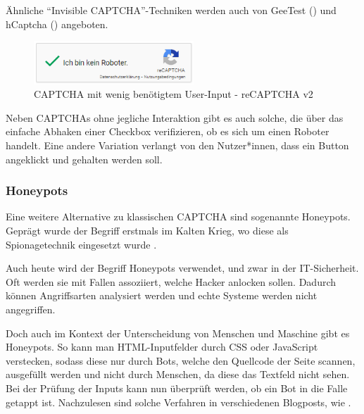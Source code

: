 Ähnliche ``Invisible CAPTCHA''-Techniken werden auch von GeeTest \linebreak(\cite{geetest}) und hCaptcha (\cite{hcaptcha}) angeboten.

\begin{figure}[h!]
    \centering\includegraphics[width=6cm]{gfx/mygraphics/recaptcha.png}
     \caption{CAPTCHA mit wenig benötigtem User-Input - reCAPTCHA v2}
      \label{fig:recaptcha}
\end{figure}

\pagebreak

Neben CAPTCHAs ohne jegliche Interaktion gibt es auch solche, 
die über das einfache Abhaken einer Checkbox verifizieren, ob es sich um einen Roboter handelt.
Eine andere Variation verlangt von den Nutzer*innen, dass ein Button angeklickt und gehalten werden soll. 

\subsubsection*{Honeypots}
Eine weitere Alternative zu klassischen CAPTCHA sind sogenannte Honeypots. 
Geprägt wurde der Begriff erstmals im Kalten Krieg, wo diese als Spionagetechnik eingesetzt wurde \cite[p.2]{joshi:2011}.  

Auch heute wird der Begriff Honeypots verwendet, und zwar in der IT-Sicherheit. 
Oft werden sie mit Fallen assoziiert, welche Hacker anlocken sollen. 
Dadurch können Angriffsarten analysiert werden und echte Systeme werden nicht angegriffen.

Doch auch im Kontext der Unterscheidung von Menschen und Maschine gibt es Honeypots. 
So kann man HTML-Inputfelder durch CSS oder JavaScript verstecken, sodass diese nur durch Bots, welche den Quellcode der Seite scannen, ausgefüllt werden 
und nicht durch Menschen, da diese das Textfeld nicht sehen. 
Bei der Prüfung der Inputs kann nun überprüft werden, ob ein Bot in die Falle getappt ist. 
Nachzulesen sind solche Verfahren in verschiedenen Blogposts, wie \cite{perry:2019}.

